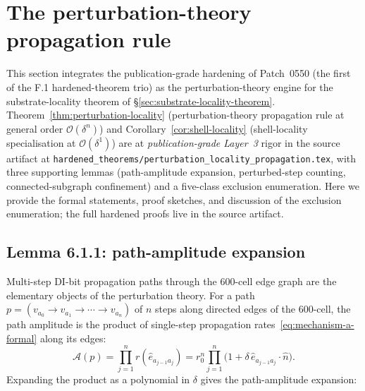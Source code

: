 \documentclass[11pt,letterpaper]{article}
\newcommand{\bigO}[1]{\mathcal{O}(#1)}
\begin{document}
\section{The perturbation-theory propagation rule}
\label{sec:perturbation-locality}


This section integrates the publication-grade hardening of Patch~0550 (the first of the F.1 hardened-theorem trio) as the perturbation-theory engine for the substrate-locality theorem of \S\ref{sec:substrate-locality-theorem}. Theorem~\ref{thm:perturbation-locality} (perturbation-theory propagation rule at general order $\bigO{\delta^n}$) and Corollary~\ref{cor:shell-locality} (shell-locality specialisation at $\bigO{\delta^1}$) are at \emph{publication-grade Layer~3} rigor in the source artifact at \texttt{hardened\_theorems/perturbation\_locality\_propagation.tex}, with three supporting lemmas (path-amplitude expansion, perturbed-step counting, connected-subgraph confinement) and a five-class exclusion enumeration. Here we provide the formal statements, proof sketches, and discussion of the exclusion enumeration; the full hardened proofs live in the source artifact.

\subsection{Lemma 6.1.1: path-amplitude expansion}
\label{sec:path-amplitude-expansion}

Multi-step DI-bit propagation paths through the 600-cell edge graph are the elementary objects of the perturbation theory. For a path $p = (v_{a_0} \to v_{a_1} \to \cdots \to v_{a_n})$ of $n$ steps along directed edges of the 600-cell, the path amplitude is the product of single-step propagation rates~\eqref{eq:mechanism-a-formal} along its edges:
\[
\mathcal{A}(p) = \prod_{j=1}^{n} r(\hat{e}_{a_{j-1} a_j}) = r_0^n \prod_{j=1}^{n} \big(1 + \delta \, \hat{e}_{a_{j-1} a_j} \cdot \hat{n}\big).
\]
Expanding the product as a polynomial in $\delta$ gives the path-amplitude expansion:
\end{document}
